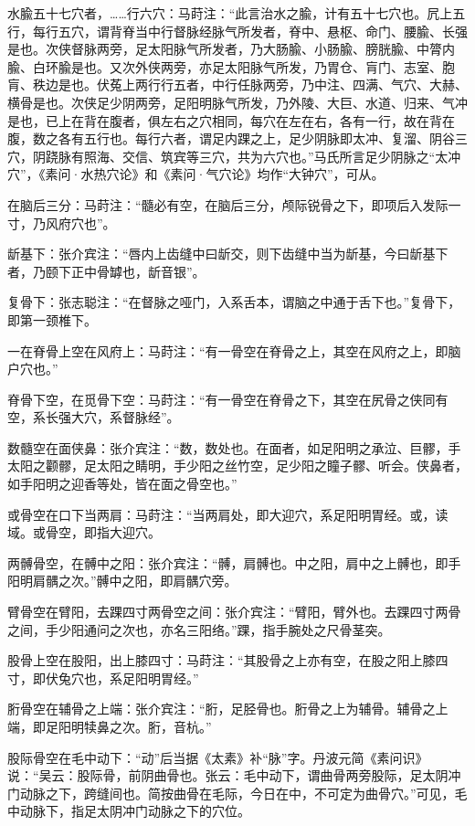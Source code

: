 \documentclass[12pt]{ctexbook}%
\begin{document}
\begin{jiaozhu}
  \item 水腧五十七穴者，……行六穴：马莳注：“此言治水之腧，计有五十七穴也。凥上五行，每行五穴，谓背脊当中行督脉经脉气所发者，脊中、悬枢、命门、腰腧、长强是也。次侠督脉两旁，足太阳脉气所发者，乃大肠腧、小肠腧、膀胱腧、中膂内腧、白环腧是也。又次外侠两旁，亦足太阳脉气所发，乃胃仓、肓门、志室、胞肓、秩边是也。伏菟上两行行五者，中行任脉两旁，乃中注、四满、气穴、大赫、横骨是也。次侠足少阴两旁，足阳明脉气所发，乃外陵、大巨、水道、归来、气冲是也，已上在背在腹者，俱左右之穴相同，每穴在左在右，各有一行，故在背在腹，数之各有五行也。每行六者，谓足内踝之上，足少阴脉即太冲、复溜、阴谷三穴，阴跷脉有照海、交信、筑宾等三穴，共为六穴也。”马氏所言足少阴脉之“太冲穴”，《素问·水热穴论》和《素问·气穴论》均作“大钟穴”，可从。
  \item 在脑后三分：马莳注：“髓必有空，在脑后三分，颅际锐骨之下，即项后入发际一寸，乃风府穴也”。
  \item 龂基下：张介宾注：“唇内上齿缝中曰龂交，则下齿缝中当为龂基，今曰龂基下者，乃颐下正中骨罅也，龂音银”。
  \item 复骨下：张志聪注：“在督脉之哑门，入系舌本，谓脑之中通于舌下也。”复骨下，即第一颈椎下。
  \item 一在脊骨上空在风府上：马莳注：“有一骨空在脊骨之上，其空在风府之上，即脑户穴也。”
  \item 脊骨下空，在觅骨下空：马莳注：“有一骨空在脊骨之下，其空在尻骨之侠同有空，系长强大穴，系督脉经”。
  \item 数髓空在面侠鼻：张介宾注：“数，数处也。在面者，如足阳明之承泣、巨髎，手太阳之颧髎，足太阳之睛明，手少阳之丝竹空，足少阳之瞳子髎、听会。侠鼻者，如手阳明之迎香等处，皆在面之骨空也。”
  \item 或骨空在口下当两肩：马莳注：“当两肩处，即大迎穴，系足阳明胃经。或，读域。或骨空，即指大迎穴。
  \item 两髆骨空，在髆中之阳：张介宾注：“髆，肩髆也。中之阳，肩中之上髆也，即手阳明肩髃之次。”髆中之阳，即肩髃穴旁。
  \item 臂骨空在臂阳，去踝四寸两骨空之间：张介宾注：“臂阳，臂外也。去踝四寸两骨之间，手少阳通问之次也，亦名三阳络。”踝，指手腕处之尺骨茎突。
  \item 股骨上空在股阳，出上膝四寸：马莳注：“其股骨之上亦有空，在股之阳上膝四寸，即伏兔穴也，系足阳明胃经。”
  \item 胻骨空在辅骨之上端：张介宾注：“胻，足胫骨也。胻骨之上为辅骨。辅骨之上端，即足阳明犊鼻之次。胻，音杭。”
  \item 股际骨空在毛中动下：“动”后当据《太素》补“脉”字。丹波元简《素问识》说：“吴云：股际骨，前阴曲骨也。张云：毛中动下，谓曲骨两旁股际，足太阴冲门动脉之下，跨缝间也。简按曲骨在毛际，今日在中，不可定为曲骨穴。”可见，毛中动脉下，指足太阴冲门动脉之下的穴位。

\end{jiaozhu}
\end{document}
